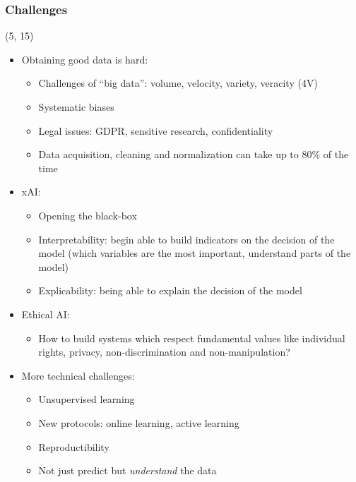 \begin{frame}
  \frametitle{Challenges}

  \begin{textblock}{90}(5, 15)
    \begin{itemize}
    \item Obtaining good data is hard:
      \begin{itemize}
      \item Challenges of ``big data'': volume, velocity, variety, veracity (4V)
      \item Systematic biases
      \item Legal issues: GDPR, sensitive research, confidentiality
      \item Data acquisition, cleaning and normalization can take up to 80\% of
        the time
      \end{itemize}
    \item \acl{xAI}:
      \begin{itemize}
      \item Opening the black-box
      \item Interpretability: begin able to build indicators on the decision of the model
        (which variables are the most important, understand parts of the model)
      \item Explicability: being able to explain the decision of the model
      \end{itemize}
    \item Ethical \ac{AI}:
      \begin{itemize}
      \item How to build systems which respect fundamental values like individual rights, privacy, non-discrimination and non-manipulation?
      \end{itemize}
    \item More technical challenges:
      \begin{itemize}
      \item Unsupervised learning
      \item New protocols: online learning, active learning
      \item Reproductibility
      \item Not just predict but \emph{understand} the data
      \end{itemize}
    \end{itemize}
  \end{textblock}
\end{frame}
